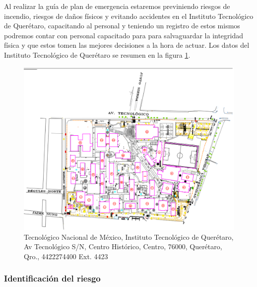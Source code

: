     Al realizar la guía de plan de emergencia estaremos previniendo riesgos de incendio, riesgos de daños físicos y evitando accidentes en el Instituto Tecnológico de Querétaro, capacitando al personal y teniendo un registro de estos mismos podremos contar con personal capacitado para para salvaguardar la integridad física y que estos tomen las mejores decisiones a la hora de actuar.
    Los datos del Instituto Tecnológico de Querétaro se resumen en la figura  \ref{fig:croquisTec}.
    \begin{figure}[H]
        \centering
        \includegraphics[scale=0.3]{13/img/croquisTec.pdf}
        \caption{Tecnológico Nacional de México, Instituto Tecnológico de Querétaro, Av Tecnológico S/N, Centro Histórico, Centro, 76000, Querétaro, Qro., 4422274400 Ext. 4423}
        \label{fig:croquisTec}
    \end{figure}
    \subsubsection{Identificación del riesgo}
    
